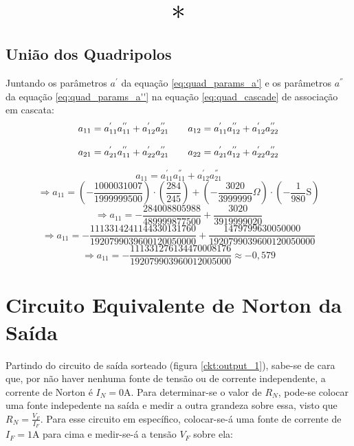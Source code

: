 \documentclass{report}
\let\oldsection\section
\renewcommand\section{\clearpage\oldsection}
\begin{document}
\begin{center}
    \[ \scalebox{3}{$ * $} \]
\end{center}

\subsection{União dos Quadripolos}

Juntando os parâmetros $ a^{'} $ da equação \ref{eq:quad_params_a'} e os parâmetros $ a^{''} $ da equação \ref{eq:quad_params_a''} na equação \ref{eq:quad_cascade} de
associação em cascata:
\begin{equation}
  \label{eq:bad}
  \centering
  \begin{matrix}
    a_{11} = a^{'}_{11}a^{''}_{11} + a^{'}_{12}a^{''}_{21} & \hspace{10pt} a_{12} = a^{'}_{11}a^{''}_{12} + a^{'}_{12}a^{''}_{22} \\\\
    a_{21} = a^{'}_{21}a^{''}_{11} + a^{'}_{22}a^{''}_{21} & \hspace{10pt} a_{22} = a^{'}_{21}a^{''}_{12} + a^{'}_{22}a^{''}_{22}
  \end{matrix}
\end{equation}

$$ a_{11} = a^{'}_{11}a^{''}_{11} + a^{'}_{12}a^{''}_{21} $$
$$ \Rightarrow a_{11} = \left(- \frac{1000031007}{1999999500}\right) \cdot \left(\frac{284}{245}\right) + \left(- \frac{3020}{3999999} \Omega\right) \cdot \left(- \frac{1}{980}\text{S}\right) $$
$$ \Rightarrow a_{11} = - \frac{284008805988}{489999877500} + \frac{3020}{3919999020} $$
$$ \Rightarrow a_{11} = - \frac{1113314241144330131760}{1920799039600120050000} + \frac{1479799630050000}{1920799039600120050000} $$
$$ \Rightarrow a_{11} = - \frac{111331276134470008176}{192079903960012005000} \approx -0,\!579 $$

\section{Circuito Equivalente de Norton da Saída}

Partindo do circuito de saída sorteado (figura \ref{ckt:output_1}), sabe-se de cara que, por não haver nenhuma fonte de tensão ou de corrente independente,
a corrente de Norton é $ I_N = 0 \text{A} $. Para determinar-se o valor de $ R_N $, pode-se colocar uma fonte indepedente na saída e medir a outra grandeza
sobre essa, visto que $ R_N = \frac{V_F}{I_F} $. Para esse circuito em específico, colocar-se-á uma fonte de corrente de $ I_F = 1\text{A} $ para cima e medir-se-á
a tensão $ V_F $ sobre ela:
\end{document}
